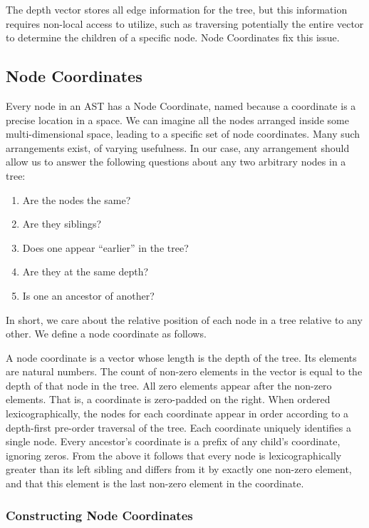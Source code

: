 \documentclass[numbers,9pt]{sigplanconf}
\begin{document}
\noindent
The depth vector stores all edge information for the tree, but this information 
requires non-local access to utilize, such as traversing potentially the 
entire vector to determine the children of a specific node.
Node Coordinates fix this issue.

\subsection{Node Coordinates}

Every node in an AST has a Node Coordinate, named because a coordinate
is a precise location in a space.  We can imagine all the nodes
arranged inside some multi-dimensional space, leading to a specific
set of node coordinates. Many such arrangements exist, of varying
usefulness. In our case, any arrangement should allow us to answer
the following questions about any two arbitrary nodes in a tree:

\begin{enumerate}[noitemsep]
\item Are the nodes the same?
\item Are they siblings?
\item Does one appear ``earlier'' in the tree?
\item Are they at the same depth?
\item Is one an ancestor of another?
\end{enumerate}

\noindent
In short, we care about the relative position of each node in a tree
relative to any other. We define a node coordinate as follows.

A node coordinate is a vector whose length is the depth of the
tree. Its elements are natural numbers.  The count of non-zero elements
in the vector is equal to the depth of that node in the tree. All zero
elements appear after the non-zero elements. That is, a coordinate
is zero-padded on the right. When ordered lexicographically, the
nodes for each coordinate appear in order according to a depth-first
pre-order traversal of the tree. Each coordinate uniquely identifies a
single node. Every ancestor’s coordinate is a prefix of any child’s
coordinate, ignoring zeros. From the above it follows that every node
is lexicographically greater than its left sibling and differs from
it by exactly one non-zero element, and that this element is the last
non-zero element in the coordinate.


\subsubsection{Constructing Node Coordinates}
\end{document}

